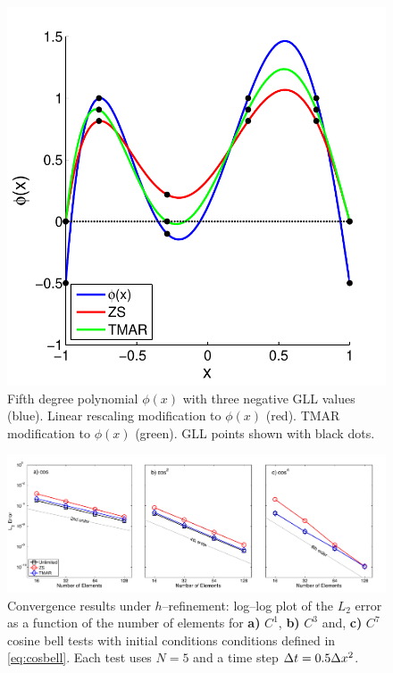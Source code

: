 \documentclass{ametsoc}
\begin{document}
\begin{figure}[t]
\includegraphics[width=0.5 \textwidth]{figs/1d/zsTMAR_compareEx.pdf}
\caption{Fifth degree polynomial $\phi(x)$ with three negative GLL values (blue). Linear rescaling modification to $\phi(x)$ (red). TMAR modification to $\phi(x)$ (green). GLL points shown with black dots. } \label{fig:polyModCompare}
\end{figure}


\begin{figure}[t]
\includegraphics[width= \textwidth]{figs/1d/cosbell_hConvg_nodal.pdf}
\caption{Convergence results under $h$--refinement: log--log plot of the $L_2$ error as a function of the number of elements for {\bf a)} $C^1$, {\bf b)} $C^3$ and, {\bf c)} $C^7$ cosine bell tests with initial conditions  conditions defined in \eqref{eq:cosbell}. Each test uses $N=5$ and a time step $\Delta t = 0.5 \Delta x^{2}$. } \label{fig:cosConv-h}
\end{figure}
\end{document}
